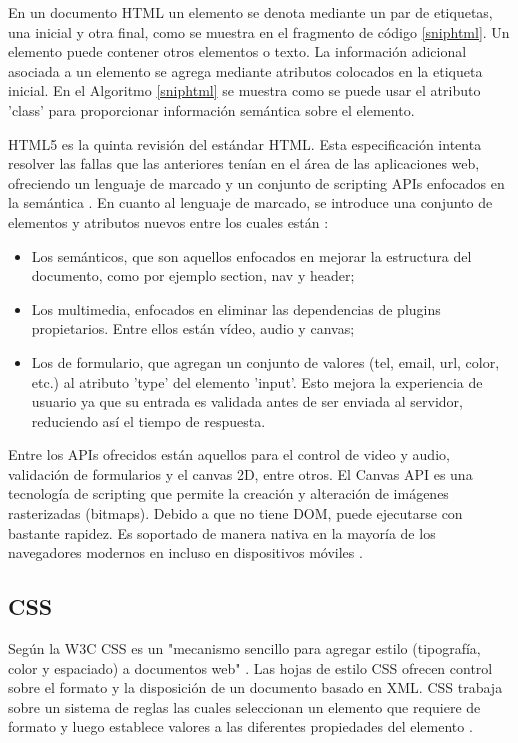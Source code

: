 En un documento HTML un elemento se denota mediante un par de etiquetas, una inicial y otra final, como se muestra en el fragmento de código \ref{sniphtml}. Un elemento puede contener otros elementos o texto. La información adicional asociada a un elemento se agrega mediante atributos colocados en la etiqueta inicial. En el Algoritmo \ref{sniphtml} se muestra como se puede usar el atributo 'class' para proporcionar información semántica sobre el elemento.



HTML5 es la quinta revisión del estándar HTML. Esta especificación intenta resolver las fallas que las anteriores tenían en el área de las aplicaciones web, ofreciendo un lenguaje de marcado y un conjunto de scripting APIs enfocados en la semántica \cite{Html5}. En cuanto al lenguaje de marcado, se introduce una conjunto de elementos y atributos nuevos entre los cuales están \cite{Diff13}:

\begin{itemize}
  \item Los semánticos, que son aquellos enfocados en mejorar la estructura del documento, como por ejemplo section, nav y header;
  \item Los multimedia, enfocados en eliminar las dependencias de plugins propietarios. Entre ellos están vídeo, audio y canvas;
  \item Los de formulario, que agregan un conjunto de valores (tel, email, url, color, etc.) al atributo 'type' del elemento 'input'. Esto mejora la experiencia de usuario ya que su entrada es validada antes  de ser enviada al servidor, reduciendo así el tiempo de respuesta.
\end{itemize}

Entre los APIs ofrecidos están aquellos para el control de video y audio, validación de formularios y el canvas 2D, entre otros. El Canvas API es una tecnología de scripting que permite la creación y alteración de imágenes rasterizadas (bitmaps). Debido a que no tiene DOM, puede ejecutarse con bastante rapidez. Es soportado de manera nativa en la mayoría de los navegadores modernos en incluso en dispositivos móviles \cite{Gra13}.

\subsection{CSS}

Según la W3C CSS es un "mecanismo sencillo para agregar estilo (tipografía, color y espaciado) a documentos web" \cite{HnC13}. Las hojas de estilo CSS ofrecen control sobre el formato y la disposición de un documento basado en XML. CSS trabaja sobre un sistema de reglas las cuales seleccionan un elemento que requiere de formato y luego establece valores a las diferentes propiedades del elemento \cite{Wp14}.

